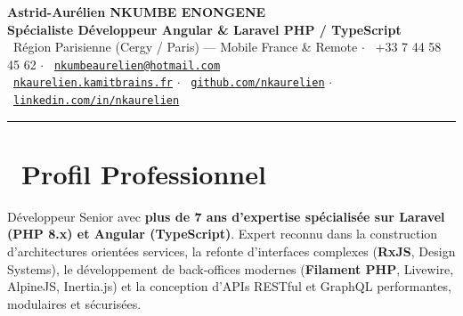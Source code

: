 \documentclass[10pt,a4paper]{article}
\begin{document}
\begin{center}
    {\LARGE\bfseries\color{primary} Astrid-Aurélien NKUMBE ENONGENE}\\[0.25em]
    {\large\bfseries\color{darkgray} Spécialiste Développeur Angular \& Laravel PHP / TypeScript}\\[0.4em]
    {\footnotesize\color{slateGray}
        \faMapMarker*\ Région Parisienne (Cergy / Paris) --- Mobile France \& Remote \quad$\cdot$\quad
        \faPhone*\ +33 7 44 58 45 62 \quad$\cdot$\quad
        \faEnvelope\ \href{mailto:nkumbeaurelien@hotmail.com}{\texttt{nkumbeaurelien@hotmail.com}}\\[0.25em]
        \faGlobe\ \href{https://nkaurelien.kamitbrains.fr}{\texttt{nkaurelien.kamitbrains.fr}} \quad$\cdot$\quad
        \faGithub\ \href{https://github.com/nkaurelien}{\texttt{github.com/nkaurelien}} \quad$\cdot$\quad
        \faLinkedin\ \href{https://www.linkedin.com/in/nkaurelien/}{\texttt{linkedin.com/in/nkaurelien}}
    }
\end{center}

\vspace{0.1em}
\textcolor{ruleGray}{\rule{\linewidth}{1pt}}
\vspace{0.35em}

\section{\faLightbulb\ Profil Professionnel}
Développeur Senior avec \textbf{plus de 7 ans d'expertise spécialisée sur Laravel (PHP 8.x) et Angular (TypeScript)}. Expert reconnu dans la construction d'architectures orientées services, la refonte d'interfaces complexes (\textbf{RxJS}, Design Systems), le développement de back-offices modernes (\textbf{Filament PHP}, Livewire, AlpineJS, Inertia.js) et la conception d'APIs RESTful et GraphQL performantes, modulaires et sécurisées.

\end{document}
